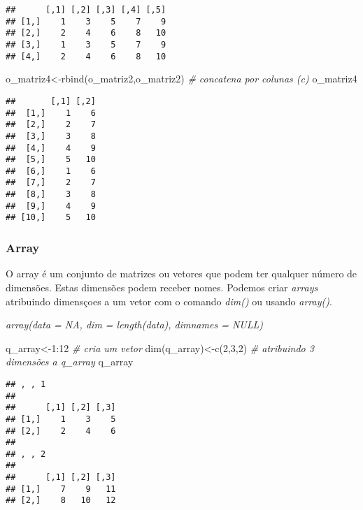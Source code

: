 \documentclass[
]{book}
\newenvironment{Shaded}{\begin{snugshade}}{\end{snugshade}}
\newcommand{\CommentTok}[1]{\textcolor[rgb]{0.56,0.35,0.01}{\textit{#1}}}
\newcommand{\DecValTok}[1]{\textcolor[rgb]{0.00,0.00,0.81}{#1}}
\newcommand{\FunctionTok}[1]{\textcolor[rgb]{0.00,0.00,0.00}{#1}}
\newcommand{\NormalTok}[1]{#1}
\newcommand{\OtherTok}[1]{\textcolor[rgb]{0.56,0.35,0.01}{#1}}
\newcommand{\SpecialCharTok}[1]{\textcolor[rgb]{0.00,0.00,0.00}{#1}}
\begin{document}
\begin{verbatim}
##      [,1] [,2] [,3] [,4] [,5]
## [1,]    1    3    5    7    9
## [2,]    2    4    6    8   10
## [3,]    1    3    5    7    9
## [4,]    2    4    6    8   10
\end{verbatim}

\begin{Shaded}
\begin{Highlighting}[]
\NormalTok{o\_matriz4}\OtherTok{\textless{}{-}}\FunctionTok{rbind}\NormalTok{(o\_matriz2,o\_matriz2) }\CommentTok{\# concatena por colunas (c)}
\NormalTok{o\_matriz4}
\end{Highlighting}
\end{Shaded}

\begin{verbatim}
##       [,1] [,2]
##  [1,]    1    6
##  [2,]    2    7
##  [3,]    3    8
##  [4,]    4    9
##  [5,]    5   10
##  [6,]    1    6
##  [7,]    2    7
##  [8,]    3    8
##  [9,]    4    9
## [10,]    5   10
\end{verbatim}

\hypertarget{array}{%
\subsubsection{Array}\label{array}}

O array é um conjunto de matrizes ou vetores que podem ter qualquer número de dimensões. Estas dimensões podem receber nomes.
Podemos criar \emph{arrays} atribuindo dimensçoes a um vetor com o comando \emph{dim()} ou usando \emph{array()}.

\emph{\emph{array(data = NA, dim = length(data), dimnames = NULL)}}

\begin{Shaded}
\begin{Highlighting}[]
\NormalTok{q\_array}\OtherTok{\textless{}{-}}\DecValTok{1}\SpecialCharTok{:}\DecValTok{12} \CommentTok{\# cria um vetor}
\FunctionTok{dim}\NormalTok{(q\_array)}\OtherTok{\textless{}{-}}\FunctionTok{c}\NormalTok{(}\DecValTok{2}\NormalTok{,}\DecValTok{3}\NormalTok{,}\DecValTok{2}\NormalTok{) }\CommentTok{\# atribuindo 3 dimensões a q\_array}
\NormalTok{q\_array}
\end{Highlighting}
\end{Shaded}

\begin{verbatim}
## , , 1
## 
##      [,1] [,2] [,3]
## [1,]    1    3    5
## [2,]    2    4    6
## 
## , , 2
## 
##      [,1] [,2] [,3]
## [1,]    7    9   11
## [2,]    8   10   12
\end{verbatim}
\end{document}
